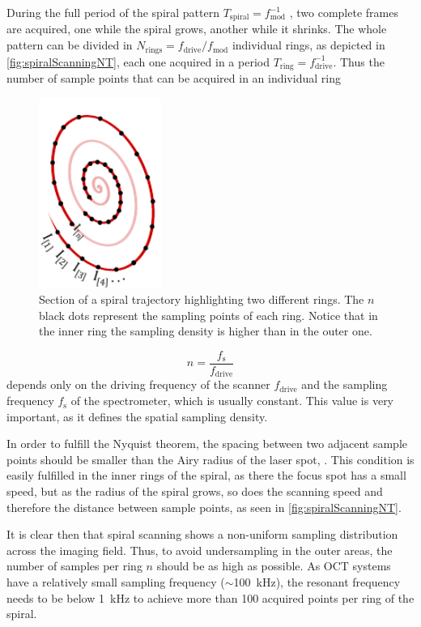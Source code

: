 During the full period of the spiral pattern $T_\mathrm{spiral}=f_\mathrm{mod}^{-1}$ , two complete frames are acquired, one while the spiral grows, another while it shrinks. The whole pattern can be divided in $N_\mathrm{rings} = f_\mathrm{drive}/f_\mathrm{mod}$ individual rings, as depicted in \autoref{fig:spiralScanningNT}, each one acquired in a period $T_\mathrm{ring}=f_\mathrm{drive}^{-1}$. Thus the number of sample points that can be acquired in an individual ring
\begin{figure}[h!]\centering
      \includegraphics[width=4cm]{figures/30_DesignSimulation/spiralScanning/spiralScanningNT.pdf}
      \caption{Section of a spiral trajectory highlighting two different rings. The $n$ black dots represent the sampling points of each ring. Notice that in the inner ring the sampling density is higher than in the outer one.}
      \label{fig:spiralScanningNT}
\end{figure}
\begin{equation}
n = \frac{f_\mathrm{s}}{f_\mathrm{drive}}
\label{eq:nT}
\end{equation}
depends only on the driving frequency of the scanner $f_\mathrm{drive}$ and the sampling frequency $f_\mathrm{s}$ of the spectrometer, which is usually constant. This value is very important, as it defines the spatial sampling density. 

In order to fulfill the Nyquist theorem, the spacing between two adjacent sample points should be smaller than the Airy radius of the laser spot, . This condition is easily fulfilled in the inner rings of the spiral, as there the focus spot has a small speed, but as the radius of the spiral grows, so does the scanning speed and therefore the distance between sample points, as seen in \autoref{fig:spiralScanningNT}.

It is clear then that spiral scanning shows a non-uniform sampling distribution across the imaging field. Thus, to avoid undersampling in the outer areas, the number of samples per ring $n$ should be as high as possible. As OCT systems have a relatively small sampling frequency ($\sim$\SI{100}{\kilo\hertz}), the resonant frequency needs to be below \SI{1}{kHz} to achieve more than 100 acquired points per ring of the spiral.



